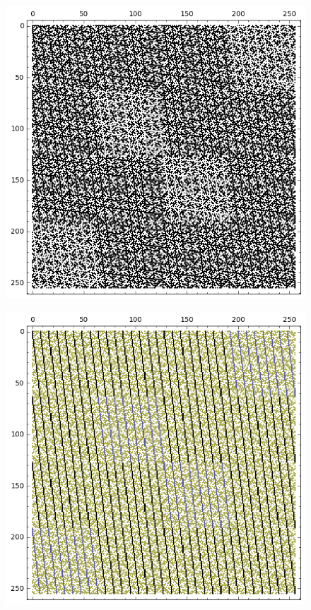 \documentclass[12pt,a4paper]{article}
\begin{document}
\begin{figure}[!bhpt] %
\centering
\begin{minipage}{.48\textwidth}
  \centering
  \includegraphics[width=.9\linewidth]{../matrix_plot/re8_2_weight_class_matrix.png}
  \label{fig:8_2_weight_class_matrix}
\end{minipage}%
\begin{minipage}{.48\textwidth}
  \centering
  \includegraphics[width=.9\linewidth]{../matrix_plot/re8_2_bent_cayley_graph_index_matrix.png}
  \label{fig:8_2_bent_cayley_graph_index_matrix}
\end{minipage}
\end{figure}
~
%
\end{document}

